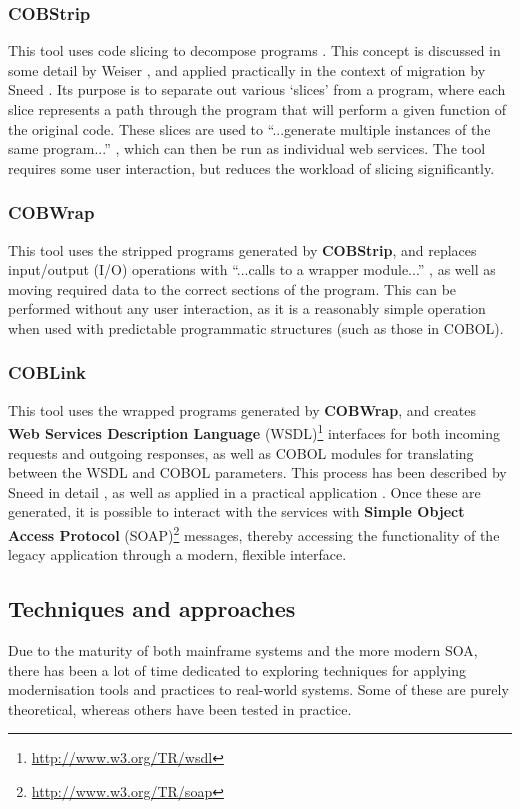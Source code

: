 \documentclass[12pt,journal,compsoc]{IEEEtran}
\begin{document}
\subsubsection{COBStrip}
\label{subsubsec:cobstrip}
This tool uses code slicing to decompose programs \cite{Canfora2000}. This concept is discussed in some detail by Weiser \cite{Weiser1984}, and applied practically in the context of migration by Sneed \cite{Sneed2009,Sneed2008}. Its purpose is to separate out various `slices' from a program, where each slice represents a path through the program that will perform a given function of the original code. These slices are used to ``...generate multiple instances of the same program...'' \cite{Sneed2009,Sneed2008}, which can then be run as individual web services. The tool requires some user interaction, but reduces the workload of slicing significantly.

\subsubsection{COBWrap}
\label{subsubsec:cobwrap}
This tool uses the stripped programs generated by \textbf{COBStrip}, and replaces input/output (I/O) operations with ``...calls to a wrapper module...'' \cite{Sneed2009,Sneed2008}, as well as moving required data to the correct sections of the program. This can be performed without any user interaction, as it is a reasonably simple operation when used with predictable programmatic structures (such as those in COBOL).

\subsubsection{COBLink}
\label{subsubsec:coblink}
This tool uses the wrapped programs generated by \textbf{COBWrap}, and creates \textbf{Web Services Description Language} (WSDL)\footnote{\url{http://www.w3.org/TR/wsdl}} interfaces for both incoming requests and outgoing responses, as well as COBOL modules for translating between the WSDL and COBOL parameters. This process has been described by Sneed in detail \cite{Sneed2001}, as well as applied in a practical application \cite{Sneed2009,Sneed2008}. Once these are generated, it is possible to interact with the services with \textbf{Simple Object Access Protocol} (SOAP)\footnote{\url{http://www.w3.org/TR/soap}} messages, thereby accessing the functionality of the legacy application through a modern, flexible interface.

\subsection{Techniques and approaches}
\label{subsec:techniques}
Due to the maturity of both mainframe systems and the more modern SOA, there has been a lot of time dedicated to exploring techniques for applying modernisation tools and practices to real-world systems. Some of these are purely theoretical, whereas others have been tested in practice.
\end{document}
